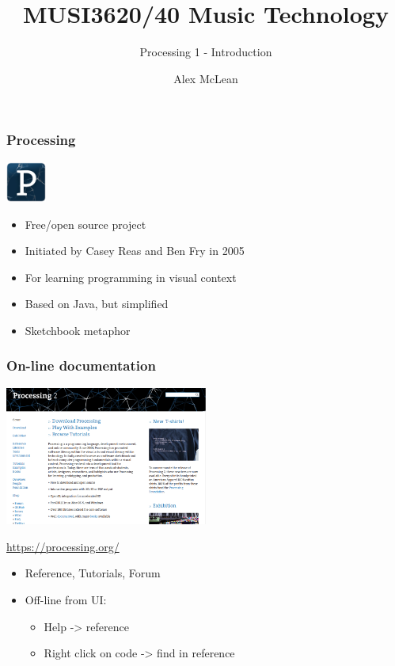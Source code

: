 \documentclass[ignorenonframetext,]{beamer}
\title{MUSI3620/40 Music Technology}
\author{Processing 1 - Introduction}
\date{Alex McLean}
\begin{document}
\frame{\titlepage}

\begin{frame}\frametitle{Processing}

\includegraphics[width=0.1\textwidth]{../images/processing2-logo.jpg}

\begin{itemize}
\item
  Free/open source project
\item
  Initiated by Casey Reas and Ben Fry in 2005
\item
  For learning programming in visual context
\item
  Based on Java, but simplified
\item
  Sketchbook metaphor
\end{itemize}

\end{frame}

\begin{frame}\frametitle{On-line documentation}

\begin{center}
\includegraphics[width=0.5\textwidth]{../images/processingorg.png}

\url{https://processing.org/}
\end{center}

\begin{itemize}
\item
  Reference, Tutorials, Forum
\item
  Off-line from UI:

  \begin{itemize}
  \item
    Help -\textgreater{} reference
  \item
    Right click on code -\textgreater{} find in reference
  \end{itemize}
\end{itemize}

\end{frame}
\end{document}
